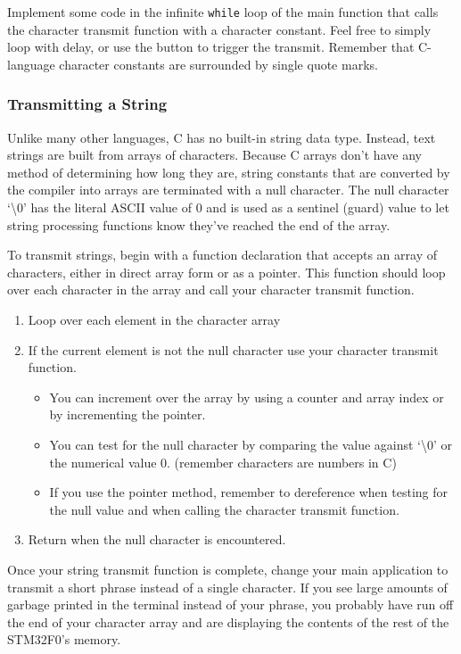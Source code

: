 \documentclass[openany,11pt,fleqn]{book} %
\begin{document}
Implement some code in the infinite \texttt{while} loop of the main function that calls the character transmit function with a character constant. Feel free to simply loop with delay, or use the button to trigger the transmit. Remember that C-language character constants are surrounded by single quote marks.

\subsubsection{Transmitting a String}
Unlike many other languages, C has no built-in string data type. Instead, text strings are built from arrays of characters. Because C arrays don't have any method of determining how long they are, string constants that are converted by the compiler into arrays are terminated with a null character. The null character `{\textbackslash}0' has the literal ASCII value of 0 and is used as a sentinel (guard) value to let string processing functions know they've reached the end of the array. 

To transmit strings, begin with a function declaration that accepts an array of characters, either in direct array form or as a pointer. This function should loop over each character in the array and call your character transmit function. 

\begin{enumerate}
 \item Loop over each element in the character array
 \item If the current element is not the null character use your character transmit function.
 \begin{itemize}
     \item You can increment over the array by using a counter and array index or by incrementing the pointer.
     \item You can test for the null character by comparing the value against `{\textbackslash}0' or the numerical value 0. (remember characters are numbers in C) 
     \item If you use the pointer method, remember to dereference when testing for the null value and when calling the character transmit function.
 \end{itemize} 
 \item Return when the null character is encountered. 
\end{enumerate}

Once your string transmit function is complete, change your main application to transmit a short phrase instead of a single character. If you see large amounts of garbage printed in the terminal instead of your phrase, you probably have run off the end of your character array and are displaying the contents of the rest of the STM32F0's memory. 
\end{document}

